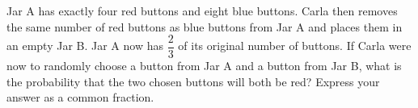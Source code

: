 Jar A has exactly four red buttons and eight blue buttons. Carla then removes the same number of red buttons as blue buttons from Jar A and places them in an empty Jar B. Jar A now has $\dfrac{2}{3}$ of its original number of buttons. If Carla were now to randomly choose a button from Jar A and a button from Jar B, what is the probability that the two chosen buttons will both be red? Express your answer as a common fraction.
